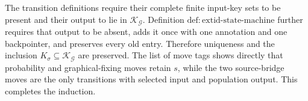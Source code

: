 The transition definitions require their complete finite input-key sets to be present and their output to lie in \(\mathscr K_{\mathcal G}\).  Definition \(\mathrm{def{:}extid\text{-}state\text{-}machine}\) further requires that output to be absent, adds it once with one annotation and one backpointer, and preserves every old entry.  Therefore uniqueness and the inclusion \(K_\sigma\subseteq\mathscr K_{\mathcal G}\) are preserved.  The list of move tags shows directly that probability and graphical-fixing moves retain \(s\), while the two source-bridge moves are the only transitions with selected input and population output.  This completes the induction.